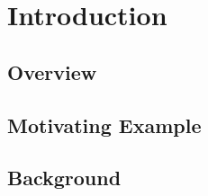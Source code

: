 \chapter{Introduction}
\label{chap:intro}

\section{Overview}
\section{Motivating Example}
\section{Background}
